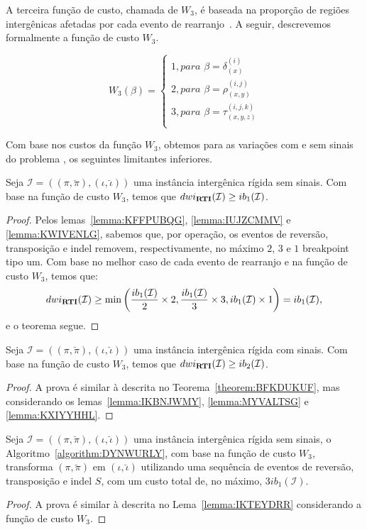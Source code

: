 A terceira função de custo, chamada de $W_3$, é baseada na proporção de regiões intergênicas afetadas por cada evento de rearranjo~\cite{2018-alexandrino-etal}. A seguir, descrevemos formalmente a função de custo $W_3$.

$$
  W_3(\beta) = \begin{cases}
      1, \textit{para } \beta = \delta_{(x)}^{(i)} \\
      2, \textit{para } \beta = \rho_{(x,y)}^{(i,j)} \\
      3, \textit{para } \beta = \tau_{(x,y,z)}^{(i,j,k)} \\
  \end{cases}
$$

Com base nos custos da função $W_3$, obtemos para as variações com e sem sinais do problema \SbWIRTI{}, os seguintes limitantes inferiores.

\begin{theorem}\label{theorem:BFKDUKUF}
Seja $\mathcal{I} = ((\pi,\breve\pi),(\iota,\breve\iota))$ uma instância intergênica rígida sem sinais. Com base na função de custo $W_3$, temos que $dwi_{\textbf{RTI}}(\mathcal{I}) \ge ib_1(\mathcal{I})$.
\begin{proof}
Pelos lemas~\ref{lemma:KFFPUBQG}, \ref{lemma:IUJZCMMV} e \ref{lemma:KWIVENLG}, sabemos que, por operação, os eventos de reversão, transposição e indel removem, respectivamente, no máximo $2$, $3$ e $1$ breakpoint tipo um. Com base no melhor caso de cada evento de rearranjo e na função de custo $W_3$, temos que:
$$dwi_{\textbf{RTI}}(\mathcal{I}) \ge \min\left(\frac{ib_1(\mathcal{I})}{2} \times 2,\frac{ib_1(\mathcal{I})}{3} \times 3, ib_1(\mathcal{I}) \times 1\right) = ib_1(\mathcal{I}),$$ e o teorema segue.
\end{proof}
\end{theorem}

\begin{theorem}\label{theorem:ACJPZCWD}
Seja $\mathcal{I} = ((\pi,\breve\pi),(\iota,\breve\iota))$ uma instância intergênica rígida com sinais. Com base na função de custo $W_3$, temos que $dwi_{\textbf{RTI}}(\mathcal{I}) \ge ib_2(\mathcal{I})$.
\begin{proof}
A prova é similar à descrita no Teorema~\ref{theorem:BFKDUKUF}, mas considerando os lemas~\ref{lemma:IKBNJWMY}, \ref{lemma:MYVALTSG} e \ref{lemma:KXIYYHHL}.
\end{proof}
\end{theorem}

\begin{lemma}\label{lemma:FESYSSFB}
Seja $\mathcal{I} = ((\pi,\breve\pi),(\iota,\breve\iota))$ uma instância intergênica rígida sem sinais, o Algoritmo~\ref{algorithm:DYNWURLY}, com base na função de custo $W_3$, transforma $(\pi,\breve\pi)$ em $(\iota,\breve\iota)$ utilizando uma sequência de eventos de reversão, transposição e indel $S$, com um custo total de, no máximo, $3ib_1(\mathcal{I})$.
\end{lemma}
\begin{proof}
  A prova é similar à descrita no Lema~\ref{lemma:IKTEYDRR} considerando a função de custo $W_3$.
\end{proof}

